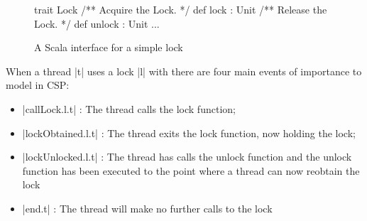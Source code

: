 \begin{figure}
\begin{scala}
  trait Lock{
    /** Acquire the Lock. */
    def lock : Unit
    /** Release the Lock. */
    def unlock : Unit 
    ...
  }
\end{scala}
\caption{A Scala interface for a simple lock}
\label{code:LockInterface}
\end{figure}

When a thread |t| uses a lock |l| with there are four main events of importance to model in CSP:

\begin{itemize}
  \item |callLock.l.t| : The thread calls the lock function;
  \item |lockObtained.l.t| : The thread exits the lock function, now holding the lock;
  \item |lockUnlocked.l.t| : The thread has calls the unlock function and the unlock function has been executed to the point where a thread can now reobtain the lock
  \item |end.t| : The thread will make no further calls to the lock 
\end{itemize}

